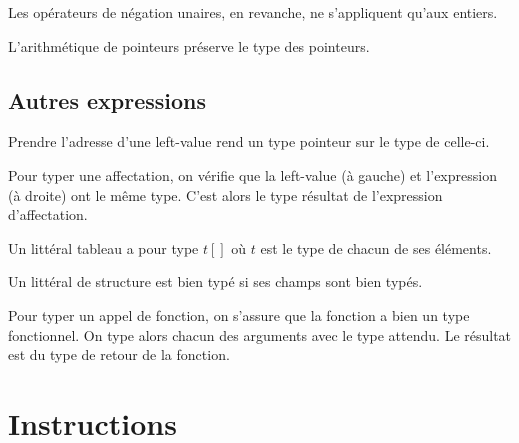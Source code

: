 Les opérateurs de négation unaires, en revanche, ne s'appliquent qu'aux
entiers.

\begin{mathpar}
\end{mathpar}

L'arithmétique de pointeurs préserve le type des pointeurs.

\begin{mathpar}
\end{mathpar}

\subsection*{Autres expressions}

Prendre l'adresse d'une left-value rend un type pointeur sur le type de
celle-ci.

\begin{mathpar}
\end{mathpar}

Pour typer une affectation, on vérifie que la left-value (à gauche) et
l'expression (à droite) ont le même type. C'est alors le type résultat de
l'expression d'affectation.

\begin{mathpar}
\end{mathpar}

Un littéral tableau a pour type $t[]$ où $t$ est le type de chacun de ses
éléments.

\begin{mathpar}
\end{mathpar}

Un littéral de structure est bien typé si ses champs sont bien typés.

\begin{mathpar}
\end{mathpar}

Pour typer un appel de fonction, on s'assure que la fonction a bien un type
fonctionnel. On type alors chacun des arguments avec le type attendu. Le
résultat est du type de retour de la fonction.

\begin{mathpar}
\end{mathpar}

\section{Instructions}

